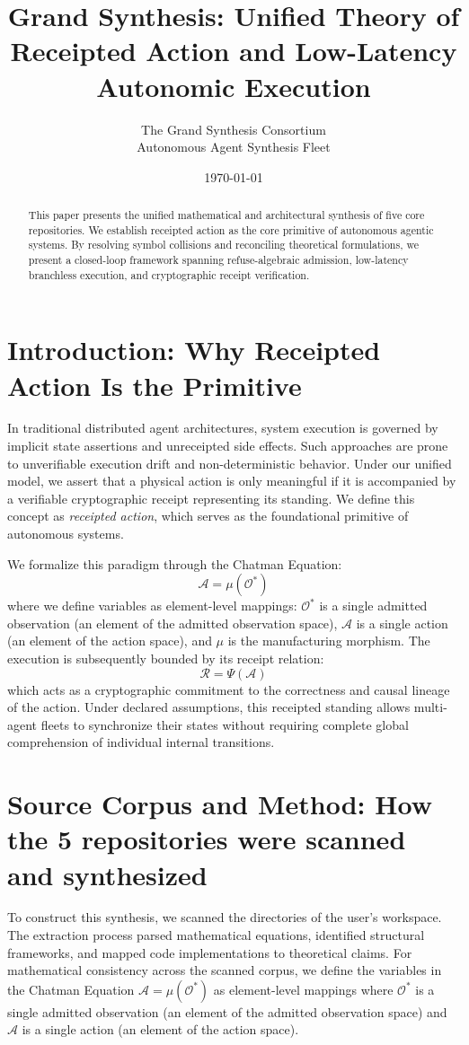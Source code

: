 \documentclass[11pt,a4paper]{article}
\title{Grand Synthesis: Unified Theory of Receipted Action and Low-Latency Autonomic Execution}
\author{The Grand Synthesis Consortium \\ \small{Autonomous Agent Synthesis Fleet}}
\date{\today}
\begin{document}
\maketitle

\begin{abstract}
This paper presents the unified mathematical and architectural synthesis of five core repositories. We establish receipted action as the core primitive of autonomous agentic systems. By resolving symbol collisions and reconciling theoretical formulations, we present a closed-loop framework spanning refuse-algebraic admission, low-latency branchless execution, and cryptographic receipt verification.
\end{abstract}

\section{Introduction: Why Receipted Action Is the Primitive}
In traditional distributed agent architectures, system execution is governed by implicit state assertions and unreceipted side effects. Such approaches are prone to unverifiable execution drift and non-deterministic behavior. Under our unified model, we assert that a physical action is only meaningful if it is accompanied by a verifiable cryptographic receipt representing its standing. We define this concept as \emph{receipted action}, which serves as the foundational primitive of autonomous systems.

We formalize this paradigm through the Chatman Equation:
\begin{equation}
\mathcal{A} = \mu(\mathcal{O}^*)
\end{equation}
where we define variables as element-level mappings: $\mathcal{O}^*$ is a single admitted observation (an element of the admitted observation space), $\mathcal{A}$ is a single action (an element of the action space), and $\mu$ is the manufacturing morphism. The execution is subsequently bounded by its receipt relation:
\begin{equation}
\mathcal{R} = \Psi(\mathcal{A})
\end{equation}
which acts as a cryptographic commitment to the correctness and causal lineage of the action. Under declared assumptions, this receipted standing allows multi-agent fleets to synchronize their states without requiring complete global comprehension of individual internal transitions.

\section{Source Corpus and Method: How the 5 repositories were scanned and synthesized}
To construct this synthesis, we scanned the directories of the user's workspace. The extraction process parsed mathematical equations, identified structural frameworks, and mapped code implementations to theoretical claims. For mathematical consistency across the scanned corpus, we define the variables in the Chatman Equation $\mathcal{A} = \mu(\mathcal{O}^*)$ as element-level mappings where $\mathcal{O}^*$ is a single admitted observation (an element of the admitted observation space) and $\mathcal{A}$ is a single action (an element of the action space).
\end{document}
